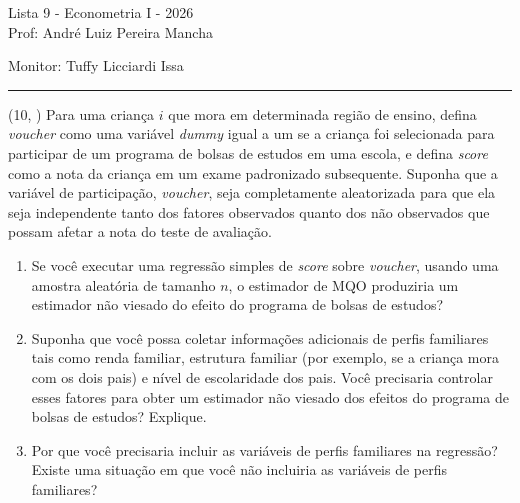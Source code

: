 \documentclass[12pt,letterpaper, onecolumn]{exam}
\begin{document}
\begingroup
    \centering
    \LARGE Lista 9 - Econometria I - 2026\\[0.5em]
    \large Prof: André Luiz Pereira Mancha \par
    \large Monitor: Tuffy Licciardi Issa \par
\endgroup
\rule{\textwidth}{0.4pt}
\pointsdroppedatright
\printanswers
\renewcommand{\solutiontitle}{\noindent\textbf{Ans:}\enspace}
\newcommand{\qstar}{\hspace{-0.6em}\textsuperscript{*}\hspace{0.2em}}

\begin{questions}

\question (10, \citep{wooldridge2016}) Para uma criança \(i\) que mora em determinada região de ensino, defina \textit{voucher} como uma variável \textit{dummy} igual a um se a criança foi selecionada para participar de um programa de bolsas de estudos em uma escola, e defina \textit{score} como a nota da criança em um exame padronizado subsequente. Suponha que a variável de participação, \textit{voucher}, seja completamente aleatorizada para que ela seja independente tanto dos fatores observados quanto dos não observados que possam afetar a nota do teste de avaliação.
\begin{enumerate}[label=(\roman*)]
    \item Se você executar uma regressão simples de \textit{score} sobre \textit{voucher}, usando uma amostra aleatória de tamanho \(n\), o estimador de MQO produziria um estimador não viesado do efeito do programa de bolsas de estudos?
    \item Suponha que você possa coletar informações adicionais de perfis familiares tais como renda familiar, estrutura familiar (por exemplo, se a criança mora com os dois pais) e nível de escolaridade dos pais. Você precisaria controlar esses fatores para obter um estimador não viesado dos efeitos do programa de bolsas de estudos? Explique.
    \item Por que você precisaria incluir as variáveis de perfis familiares na regressão? Existe uma situação em que você não incluiria as variáveis de perfis familiares?
\end{enumerate}

\vspace{0.7cm}


\end{questions}
\end{document}

